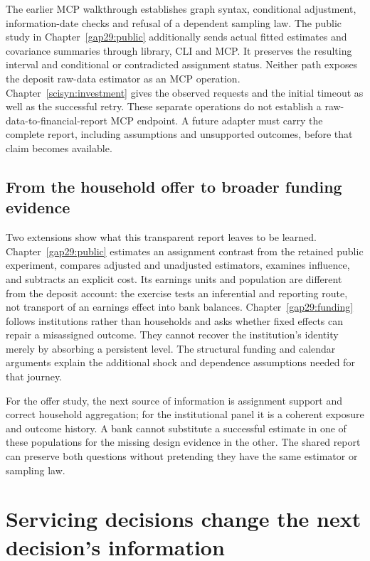The earlier MCP walkthrough establishes graph syntax, conditional
adjustment, information-date checks and refusal of a dependent sampling law.
The public study in Chapter~\ref{gap29:public} additionally sends actual
fitted estimates and covariance summaries through library, CLI and MCP.
It preserves the resulting interval and conditional or contradicted
assignment status. Neither path exposes the deposit raw-data estimator
as an MCP operation.
Chapter~\ref{scisyn:investment} gives the observed requests and the initial
timeout as well as the successful retry. These separate operations do not establish a raw-data-to-financial-report
MCP endpoint.
A future adapter must carry the complete report, including assumptions and
unsupported outcomes, before that claim becomes available.

\section{From the household offer to broader funding evidence}
Two extensions show what this transparent report leaves to be learned.
Chapter~\ref{gap29:public} estimates an assignment contrast from the retained
public experiment, compares adjusted and unadjusted estimators, examines
influence, and subtracts an explicit cost. Its earnings units and population
are different from the deposit account: the exercise tests an inferential
and reporting route, not transport of an earnings effect into bank balances.
Chapter~\ref{gap29:funding} follows institutions rather than households and
asks whether fixed effects can repair a misassigned outcome. They cannot
recover the institution's identity merely by absorbing a persistent level.
The structural funding and calendar arguments explain the additional shock
and dependence assumptions needed for that journey.

For the offer study, the next source of information is assignment support and
correct household aggregation; for the institutional panel it is a coherent
exposure and outcome history. A bank cannot substitute a successful estimate
in one of these populations for the missing design evidence in the other.
The shared report can preserve both questions without pretending they have
the same estimator or sampling law.

\chapter{Servicing decisions change the next decision's information}
\label{rewrite:servicing}


